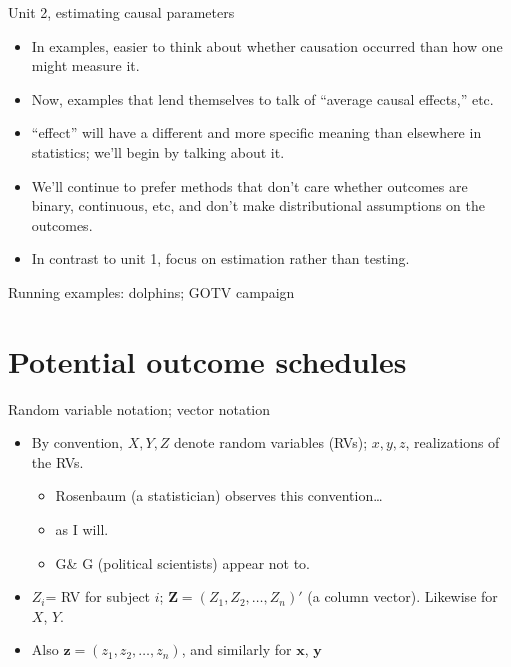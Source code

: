 \begin{frame}{Unit 2, estimating causal parameters}
  \begin{itemize}
  \item In examples, easier to think about whether causation occurred than how one might measure it.
  \item Now, examples that lend themselves to talk of ``average causal effects,'' etc.
  \item ``effect'' will have a different and more specific meaning than elsewhere in statistics; we'll begin by talking about it.
  \item We'll continue to prefer methods that don't care whether outcomes are binary, continuous, etc, and don't make distributional assumptions on the outcomes.
  \item In contrast to unit 1, focus on estimation rather than testing.
  \end{itemize}
\end{frame}

\begin{frame}{Running examples: dolphins; GOTV campaign}
  
\end{frame}

\section{Potential outcome schedules}

\begin{frame}{Random variable notation; vector notation}
  
  \begin{itemize}
  \item By convention, $X, Y, Z$ denote random variables (RVs); $x, y, z$, realizations of the RVs.
    \begin{itemize}
    \item Rosenbaum (a statistician) observes this convention\ldots
    \item as I will.
    \item G\& G (political scientists) appear not to.
    \end{itemize}
  \item $Z_i$= RV for subject $i$; $\mathbf{Z}=(Z_1, Z_2, \ldots, Z_n)'$ (a column vector).  Likewise for $X$, $Y$.
  \item Also $\mathbf{z}=(z_1, z_2, \ldots, z_n)$, and similarly for $\mathbf{x}$, $\mathbf{y}$
  \end{itemize}


\end{frame}

